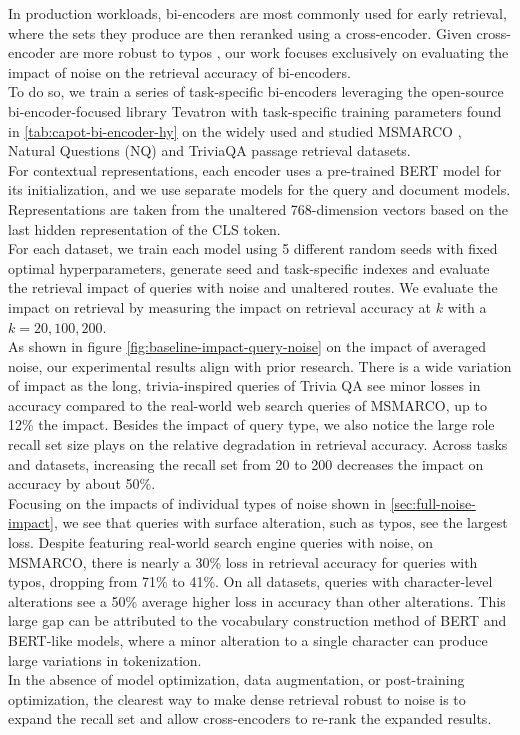 In production workloads, bi-encoders are most commonly used for early retrieval, where the sets they produce are then reranked using a cross-encoder. Given cross-encoder are more robust to typos \cite{Sidiropoulos2022AnalysingTR}, our work focuses exclusively on evaluating the impact of noise on the retrieval accuracy of bi-encoders. \\
To do so, we train  a series of task-specific bi-encoders leveraging the open-source bi-encoder-focused library Tevatron \cite{Gao2022TevatronAE} with task-specific training parameters found in \ref{tab:capot-bi-encoder-hy} on the widely used and studied MSMARCO \cite{Campos2016MSMA}, Natural Questions (NQ) \cite{Kwiatkowski2019NaturalQA} and TriviaQA \cite{Joshi2017TriviaQAAL} passage retrieval datasets. \\
For contextual representations, each encoder uses  a pre-trained BERT \cite{Devlin2019BERTPO} model for its initialization, and we use separate models for the query and document models. Representations are taken from the unaltered 768-dimension vectors based on the last hidden representation of the CLS token. \\
For each dataset, we train each model using 5 different random seeds with fixed optimal hyperparameters, generate seed and task-specific indexes and evaluate the retrieval impact of queries with noise and unaltered routes. We evaluate the impact on retrieval by measuring the impact on retrieval accuracy at $k$ with a $k={20,100,200}$.  \\
As shown in figure \ref{fig:baseline-impact-query-noise} on the impact of averaged noise, our experimental results align with prior research. There is a wide variation of impact as the long, trivia-inspired queries of Trivia QA see minor losses in accuracy compared to the real-world web search queries of MSMARCO, up to 12\% the impact. Besides the impact of query type, we also notice the large role recall set size plays on the relative degradation in retrieval accuracy. Across tasks and datasets, increasing the recall set from 20 to 200 decreases the impact on accuracy by about 50\%. \\ 
Focusing on the impacts of individual types of noise shown in \ref{sec:full-noise-impact}, we see that queries with surface alteration, such as typos, see the largest loss. Despite featuring real-world search engine queries with noise, on MSMARCO, there is nearly a 30\% loss in retrieval accuracy for queries with typos, dropping from 71\% to 41\%. On all datasets, queries with character-level alterations see a 50\% average higher loss in accuracy than other alterations. This large gap can be attributed to the vocabulary construction method of BERT and BERT-like models, where a minor alteration to a single character can produce large variations in tokenization.\\
In the absence of model optimization, data augmentation, or post-training optimization, the clearest way to make dense retrieval robust to noise is to expand the recall set and allow cross-encoders to re-rank the expanded results.\\